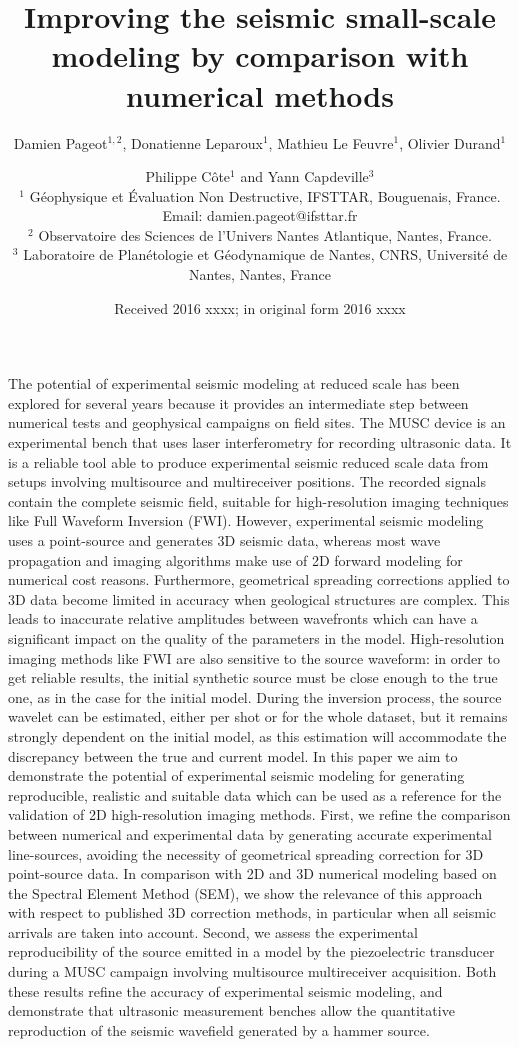\documentclass[extra,mreferee]{gji}
\title[Improving the seismic small-scale modeling by comparison with numerical methods]
	{Improving the seismic small-scale modeling by comparison with numerical methods}
\author[D. Pageot \textit{et al.}]
  {Damien Pageot$^{1,2}$, Donatienne Leparoux$^1$, Mathieu Le Feuvre$^1$, Olivier Durand$^1$ \and Philippe C\^ote$^1$ and Yann Capdeville$^3$ \\
  $^1$ G\'eophysique et \'Evaluation Non Destructive, IFSTTAR, Bouguenais, France. Email: damien.pageot@ifsttar.fr \\
  $^2$ Observatoire des Sciences de l'Univers Nantes Atlantique, Nantes, France. \\
  $^3$ Laboratoire de Plan\'etologie et G\'eodynamique de Nantes, CNRS, Universit\'e de Nantes, Nantes, France \\
  }
\date{Received 2016 xxxx; in original form 2016 xxxx}
\begin{document}
\linenumbers

\label{firstpage}

\maketitle

\begin{summary}
The potential of experimental seismic modeling at reduced scale has been explored for several years because it provides an intermediate step between numerical tests and geophysical campaigns on field sites. The MUSC device is an experimental bench that uses laser interferometry for recording ultrasonic data. It is a reliable tool able to produce experimental seismic reduced scale data from setups involving multisource and multireceiver positions. The recorded signals contain the complete seismic field, suitable for high-resolution imaging techniques like Full Waveform Inversion (FWI). However, experimental seismic modeling uses a point-source and generates 3D seismic data, whereas most wave propagation and imaging algorithms make use of 2D forward modeling for numerical cost reasons. Furthermore, geometrical spreading corrections applied to 3D data become limited in accuracy when geological structures are complex. This leads to inaccurate relative amplitudes between wavefronts which can have a significant impact on the quality of the parameters in the model. High-resolution imaging methods like FWI are also sensitive to the source waveform: in order to get reliable results, the initial synthetic source must be close enough to the true one, as in the case for the initial model. During the inversion process, the source wavelet can be estimated, either per shot or for the whole dataset, but it remains strongly dependent on the initial model, as this estimation will accommodate the discrepancy between the true and current model. In this paper we aim to demonstrate the potential of experimental seismic modeling for generating reproducible, realistic and suitable data which can be used as a reference for the validation of 2D high-resolution imaging methods. First, we refine the comparison between numerical and experimental data by generating accurate experimental line-sources, avoiding the necessity of geometrical spreading correction for 3D point-source data. In comparison with 2D and 3D numerical modeling based on the Spectral Element Method (SEM), we show the relevance of this approach with respect to published 3D correction methods, in particular when all seismic arrivals are taken into account. Second, we assess the experimental reproducibility of the source emitted in a model by the piezoelectric transducer during a MUSC campaign involving multisource multireceiver acquisition. Both these results refine the accuracy of experimental seismic modeling, and demonstrate that ultrasonic measurement benches allow the quantitative reproduction of the seismic wavefield generated by a hammer source. 
\end{summary}
\end{document}
